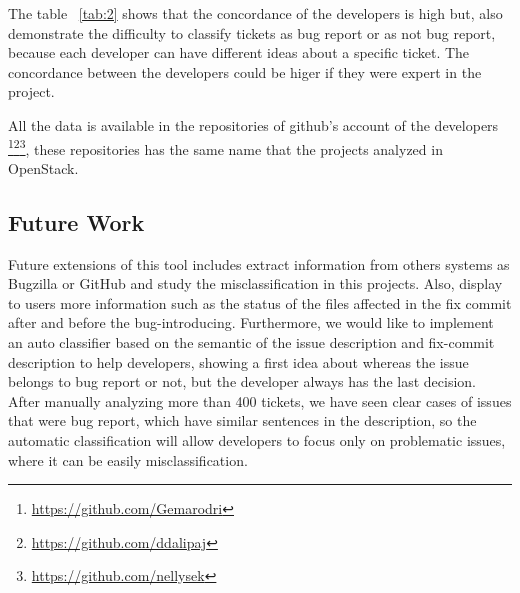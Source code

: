 \documentclass[ifip]{svmult}
\begin{document}
The table ~\ref{tab:2} shows that the concordance of the developers is high but, also demonstrate the difficulty to classify tickets as bug report or as not bug report, because each developer can have different ideas about a specific ticket. The concordance between the developers could be higer if they were expert in the project.
 
All the data is available in the repositories of github's account of the developers \footnote{\url{https://github.com/Gemarodri}}\footnote{\url{https://github.com/ddalipaj}}\footnote{\url{https://github.com/nellysek}}, these repositories has the same name that the projects analyzed in OpenStack.




\subsection{Future Work}
\label{sec:5.1}


Future extensions of this tool includes extract information from others systems as Bugzilla or GitHub and study the misclassification in this projects. Also, display to users more information such as the status of the files affected in the fix commit after and before the bug-introducing. Furthermore, we would like to implement an auto classifier based on the semantic of the issue description and fix-commit description to help developers, showing a first idea about whereas the issue belongs to bug report or not, but the developer always has the last decision. After manually analyzing more than 400 tickets, we have seen clear cases of issues that were bug report, which have similar sentences in the description, so the automatic classification will allow developers to focus only on problematic issues, where it can be easily misclassification.





\end{document}
